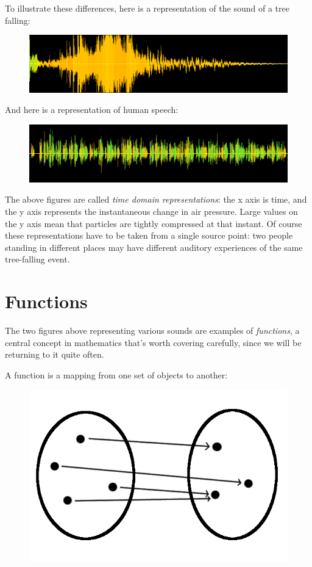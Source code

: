 \documentclass[UTF8]{book}
\begin{document}
\begin{CJK}{UTF8}{gbsn}
To illustrate these differences, here is a representation of the sound of a tree falling:

\begin{figure}[H]
\centering
\includegraphics[width=0.8\linewidth]{tree_falling_soundwave}
\end{figure}

And here is a representation of human speech:

\begin{figure}[H]
\centering
\includegraphics[width=0.8\linewidth]{shakespeare_speech}
\end{figure}

The above figures are called \emph{time domain representations}: the x axis is time, and the y axis represents the instantaneous change in air pressure. Large values on the y axis mean that particles are tightly compressed at that instant. Of course these representations have to be taken from a single source point: two people standing in different places may have different auditory experiences of the same tree-falling event.

\section{Functions}

The two figures above representing various sounds are examples of \emph{functions}, a central concept in mathematics that's worth covering carefully, since we will be returning to it quite often.

A function is a mapping from one set of objects to another:

\begin{figure}[H]
\centering
\includegraphics[width=0.8\linewidth]{function_basic}
\end{figure}


\end{CJK}
\end{document}
